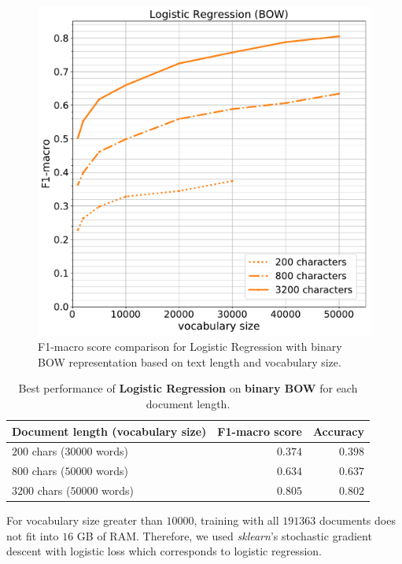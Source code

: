 \begin{figure}[h]
	\centering
	\includegraphics[height=0.3\textheight]{img/05_bow_logreg}
	\caption{F1-macro score comparison for Logistic Regression with binary BOW representation based on text length and vocabulary size.}
	\label{fig:bow_logreg}
\end{figure}

\begin{table}[h]
	\centering
	\begin{tabular}{|l|r|r|}\hline
		Document length (vocabulary size) & F1-macro score & Accuracy \\
		\hline
		$200$ chars ($30000$ words)    &   $0.374$   & $0.398$       \\
		$800$ chars ($50000$ words)     &  $0.634$   & $0.637$        \\
		$3200$ chars ($50000$ words)    &  $0.805$   & $0.802$    \\
		\hline
	\end{tabular}
	\caption{Best performance of \textbf{Logistic Regression} on \textbf{binary BOW} for each document length.}
	\label{tbl:bow_logreg}
\end{table}

For vocabulary size greater than $10000$, training with all $191363$ documents does not fit into $16$ GB of RAM. Therefore, we used \textit{sklearn}'s stochastic gradient descent with logistic loss which corresponds to logistic regression.

